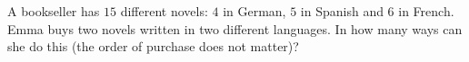 A bookseller has $15$ different novels: $4$ in German, $5$ in Spanish and $6$ in French. Emma buys two novels written in two different languages. In how many ways can she do this (the order of purchase does not matter)?
